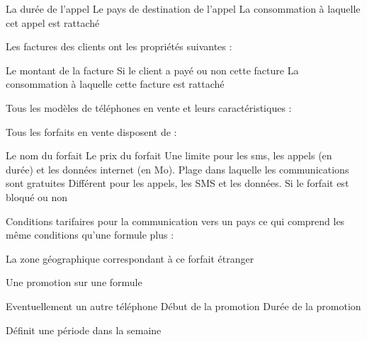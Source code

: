 \begin{itemize}
\begin{itemize}
     La durée de l'appel
     Le pays de destination de l'appel
     La consommation à laquelle cet appel est rattaché
  \end{itemize}
   Les factures des clients ont les propriétés suivantes :
  \begin{itemize}
     Le montant de la facture
     Si le client a payé ou non cette facture
     La consommation à laquelle cette facture est rattaché
  \end{itemize}
   Tous les modèles de téléphones en vente et leurs caractéristiques :
  \begin{itemize}
  \end{itemize}
   Tous les forfaits en vente disposent de :
  \begin{itemize}
     Le nom du forfait
     Le prix du forfait
     Une limite pour les sms, les appels (en durée) et les données internet (en Mo).
     Plage dans laquelle les communications sont gratuites
     Différent pour les appels, les SMS et les données.
     Si le forfait est bloqué ou non
  \end{itemize}
   Conditions tarifaires pour la communication vers un pays ce qui comprend les même conditions qu'une formule plus :
  \begin{itemize}
     La zone géographique correspondant à ce forfait étranger
  \end{itemize}
   Une promotion sur une formule
  \begin{itemize}
     Eventuellement un autre téléphone
     Début de la promotion
     Durée de la promotion
  \end{itemize}
   Définit une période dans la semaine

\end{itemize}
